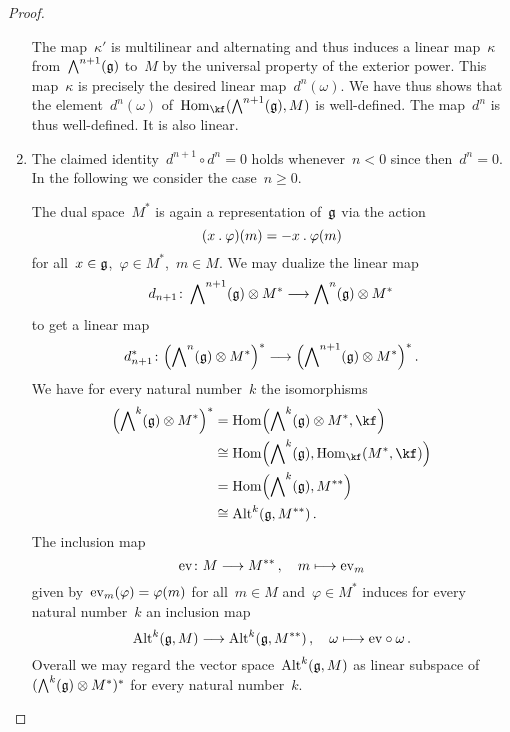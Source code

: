 \begin{proof}
\begin{enumerate}
			The map~$\kappa'$ is multilinear and alternating and thus induces a linear map~$\kappa$ from~$\operatorname{\bigwedge}^{n+1}(\mathfrak{g})$ to~$M$ by the universal property of the exterior power.
			This map~$\kappa$ is precisely the desired linear map~$d^n(\omega)$.
			We have thus shows that the element~$d^n(\omega)$ of~$\Hom_{\kf}( \Exterior^{n+1}(\glie), M)$ is well-defined.
			The map~$d^n$ is thus well-defined.
			It is also linear.
		\item
			The claimed identity~$d^{n+1} \circ d^n = 0$ holds whenever~$n < 0$ since then~$d^n = 0$.
			In the following we consider the case~$n \geq 0$.

			The dual space~$M^*$ is again a representation of~$\mathfrak{g}$ via the action
			\[
				(x \mathbin{.} \varphi)(m)
				=
				- x \mathbin{.} \varphi(m)
			\]
			for all~$x \in \mathfrak{g}$,~$\varphi \in M^*$,~$m \in M$.
			We may dualize the linear map
			\[
				d_{n+1}
				\colon
				\Exterior^{n+1}(\glie) \tensor M^*
				\to
				\Exterior^n(\glie) \tensor M^*
			\]
			to get a linear map
			\[
				d_{n+1}^*
				\colon
				\Bigl( \Exterior^n(\glie) \tensor M^* \Bigr)^*
				\to
				\Bigl( \Exterior^{n+1}(\glie) \tensor M^* \Bigr)^* \,.
			\]
			We have for every natural number~$k$ the isomorphisms
			\begin{align*}
				\Bigl( \Exterior^k(\glie) \tensor M^* \Bigr)^*
				&=
				\Hom\Bigl( \Exterior^k(\glie) \tensor M^*, \kf \Bigr)
				\\
				&\cong
				\Hom\Bigl( \Exterior^k(\glie), \Hom_{\kf}( M^*, \kf ) \Bigr)
				\\
				&=
				\Hom\Bigl( \Exterior^k(\glie), M^{**} \Bigr)
				\\
				&\cong
				\Alt^k( \glie, M^{**} ) \,.
			\end{align*}
			The inclusion map
			\[
				\ev
				\colon
				M
				\to
				M^{**} \,,
				\quad
				m
				\mapsto
				\ev_m
			\]
			given by~$\operatorname{ev}_m(\varphi) = \varphi(m)$ for all~$m \in M$ and~$\varphi \in M^*$ induces for every natural number~$k$ an inclusion map
			\[
				\Alt^k(\glie, M)
				\to
				\Alt^k(\glie, M^{**}) \,,
				\quad
				\omega
				\mapsto
				{\ev} \circ \omega \,.
			\]
			Overall we may regard the vector space~$\operatorname{Alt}^k(\mathfrak{g}, M)$ as linear subspace of~$( \operatorname{\bigwedge}^k(\mathfrak{g}) \otimes M^* )^*$ for every natural number~$k$.


\end{enumerate}
\end{proof}
